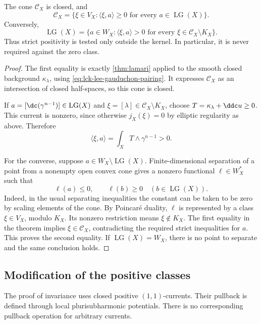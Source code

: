 \begin{theorem}\label{thm:lee-gauduchon-duality}
The cone $\mathcal C_X$ is closed, and
\[
 \mathcal C_X
 =\{\xi\in V_X:\langle\xi,a\rangle\geq0
                         \text{ for every }a\in\operatorname{LG}(X)\}.
\]
Conversely,
\[
 \operatorname{LG}(X)
 =\{a\in W_X:\langle\xi,a\rangle>0
                         \text{ for every }\xi\in\mathcal C_X\setminus K_X\}.
\]
Thus strict positivity is tested only outside the kernel. In particular, it is never required against the zero class.
\end{theorem}
\begin{proof}
The first equality is exactly \cref{thm:lamari} applied to the smooth closed background $\kappa_\lambda$, using \eqref{eq:lck-lee-gauduchon-pairing}. It expresses $\mathcal C_X$ as an intersection of closed half-spaces, so this cone is closed.

If $a=[\dc(\gamma^{n-1})]\in\operatorname{LG}(X)$ and $\xi=[\lambda]\in\mathcal C_X\setminus K_X$, choose $T=\kappa_\lambda+\ddc u\geq0$. This current is nonzero, since otherwise $j_X(\xi)=0$ by elliptic regularity as above. Therefore
\[
 \langle\xi,a\rangle
 =\int_XT\wedge\gamma^{n-1}>0.
\]

For the converse, suppose $a\in W_X\setminus\operatorname{LG}(X)$. Finite-dimensional separation of a point from a nonempty open convex cone gives a nonzero functional $\ell\in W_X^*$ such that
\[
 \ell(a)\leq0,\qquad \ell(b)\geq0
                   \quad(b\in\operatorname{LG}(X)).
\]
Indeed, in the usual separating inequalities the constant can be taken to be zero by scaling elements of the cone. By Poincar\'e duality, $\ell$ is represented by a class $\xi\in V_X$, modulo $K_X$. Its nonzero restriction means $\xi\notin K_X$. The first equality in the theorem implies $\xi\in\mathcal C_X$, contradicting the required strict inequalities for $a$. This proves the second equality. If $\operatorname{LG}(X)=W_X$, there is no point to separate and the same conclusion holds.
\end{proof}

\subsection{Modification of the positive classes}

The proof of invariance uses closed positive $(1,1)$-currents. Their pullback is defined through local plurisubharmonic potentials. There is no corresponding pullback operation for arbitrary currents.

